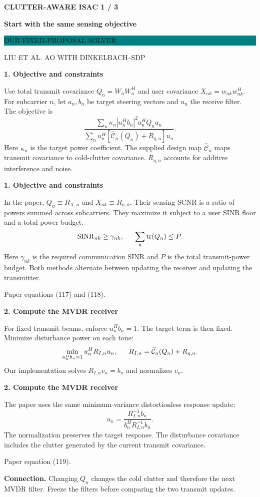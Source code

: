 \documentclass[11pt]{article}
\newcommand{\tr}{\operatorname{tr}}
\newcommand{\pair}[2]{%
\noindent\begin{minipage}[t]{.475\linewidth}\vspace{0pt}#1\end{minipage}\hfill
\begin{minipage}[t]{.475\linewidth}\vspace{0pt}#2\end{minipage}\par}
\newcommand{\head}[2]{%
{\sffamily\small\bfseries\color{teal} CLUTTER-AWARE ISAC \hfill #1 / 3}\par
{\sffamily\LARGE\bfseries\color{ink} #2}\par\vspace{3pt}
\pair{\colorbox{teal}{\parbox{.95\linewidth}{\color{white}\sffamily\bfseries\strut OUR FIXED-PROPOSAL SOLVER}}}
{\colorbox{paper}{\parbox{.95\linewidth}{\color{white}\sffamily\bfseries\strut LIU ET AL.\hspace{.85em} AO WITH DINKELBACH--SDP}}}\vspace{4pt}}
\newcommand{\sect}[1]{\par{\sffamily\large\bfseries\color{ink} #1}\par\vspace{-3pt}}
\newcommand{\rowline}{\par\vspace{3pt}{\color{line}\hrule}\vspace{5pt}}
\newcommand{\note}[1]{\par\vspace{7pt}\noindent\colorbox{wash}{\parbox{.98\linewidth}{\strut #1\strut}}\par}
\begin{document}
\head{1}{Start with the same sensing objective}
\pair{
\sect{1. Objective and constraints}
Use total transmit covariance $Q_n=W_nW_n^H$ and user covariance $X_{nk}=w_{nk}w_{nk}^H$. For subcarrier $n$, let $a_n,b_n$ be target steering vectors and $u_n$ the receive filter. The objective is
\[
\frac{\sum_n \kappa_n |u_n^Hb_n|^2 a_n^HQ_na_n}
{\sum_n u_n^H[\widehat{\mathcal C}_n(Q_n)+R_{\eta,n}]u_n}.
\]
Here $\kappa_n$ is the target power coefficient. The supplied design map $\widehat{\mathcal C}_n$ maps transmit covariance to cold-clutter covariance. $R_{\eta,n}$ accounts for additive interference and noise.
}{
\sect{1. Objective and constraints}
In the paper, $Q_n\equiv R_{X,n}$ and $X_{nk}\equiv R_{n,k}$. Their sensing SCNR is a ratio of powers summed across subcarriers. They maximize it subject to a user SINR floor and a total power budget.
\[
\mathrm{SINR}_{nk}\ge\gamma_{nk},\hspace{1.6em}
\sum_n\tr(Q_n)\le P.
\]
Here $\gamma_{nk}$ is the required communication SINR and $P$ is the total transmit-power budget. Both methods alternate between updating the receiver and updating the transmitter.

{\small\color{paper}Paper equations (117) and (118).}
}
\rowline
\pair{
\sect{2. Compute the MVDR receiver}
For fixed transmit beams, enforce $u_n^Hb_n=1$. The target term is then fixed. Minimize disturbance power on each tone:
\[
\min_{u_n^Hb_n=1} u_n^H R_{I,n}u_n,\hspace{1.6em}
R_{I,n}=\widehat{\mathcal C}_n(Q_n)+R_{\eta,n}.
\]
Our implementation solves $R_{I,n}v_n=b_n$ and normalizes $v_n$.
}{
\sect{2. Compute the MVDR receiver}
The paper uses the same minimum-variance distortionless response update:
\[
u_n=\frac{R_{I,n}^{-1}b_n}
{b_n^H R_{I,n}^{-1}b_n}.
\]
The normalization preserves the target response. The disturbance covariance includes the clutter generated by the current transmit covariance.

{\small\color{paper}Paper equation (119).}
}
\note{\textbf{Connection.} Changing $Q_n$ changes the cold clutter and therefore the next MVDR filter. Freeze the filters before comparing the two transmit updates.}
\end{document}
